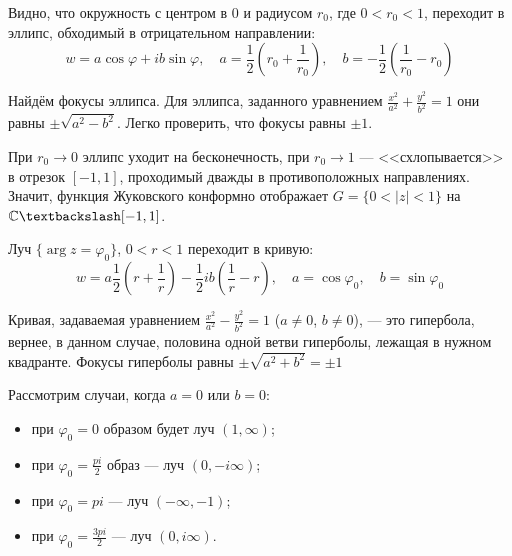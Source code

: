 \documentclass[11pt,openany,a4paper]{scrartcl}
\theoremstyle{plain}
\theoremstyle{definition}
\newcommand\mb{\mathbb}
\newcommand{\complex}{\mb C}
\begin{document}
Видно, что окружность с центром в $0$ и радиусом $r_0$, где $0 < r_0 < 1$, переходит в эллипс, обходимый в
отрицательном направлении:
$$
w = a\cos \varphi + ib\sin \varphi, \quad a = \frac{1}{2}(r_0 + \frac{1}{r_0}), \quad b = -\frac{1}{2}(\frac{1}{r_0} - r_0)
$$

Найдём фокусы эллипса. Для эллипса, заданного уравнением $\frac{x^2}{a^2} + \frac{y^2}{b^2} = 1$ они равны
$\pm \sqrt{a^2 - b^2}$. Легко проверить, что фокусы равны $\pm 1$.

При $r_0 \to 0$ эллипс уходит на бесконечность, при $r_0 \to 1$ — <<схлопывается>> в отрезок $[-1, 1]$, проходимый дважды в 
противоположных направлениях. Значит, функция Жуковского конформно отображает $G = \{0 < |z| < 1\}$ на
$\complex \textbackslash [-1, 1]$.

Луч $\{\arg z = \varphi_0\}$, $0 < r < 1$ переходит в кривую:
$$
w = a\frac{1}{2}(r + \frac{1}{r}) -\frac{1}{2}ib(\frac{1}{r} - r), \quad a = \cos \varphi_0, \quad b = \sin \varphi_0
$$

Кривая, задаваемая уравнением $\frac{x^2}{a^2} - \frac{y^2}{b^2} = 1$ ($a \neq 0$, $b \neq 0$), — это гипербола, вернее,
в данном случае, половина
одной ветви гиперболы, лежащая в нужном квадранте. Фокусы гиперболы равны $\pm \sqrt{a^2 + b^2} = \pm 1$

Рассмотрим случаи, когда $a = 0$ или $b = 0$:
\begin{itemize}
	\item при $\varphi_0 = 0$ образом будет луч $(1, \infty)$;
	\item при $\varphi_0 = \frac{pi}{2}$ образ — луч $(0, -i\infty)$;
	\item при $\varphi_0 = pi$ — луч $(-\infty, -1)$;
	\item при $\varphi_0 = \frac{3pi}{2}$ — луч $(0, i\infty)$.
\end{itemize}
\end{document}
